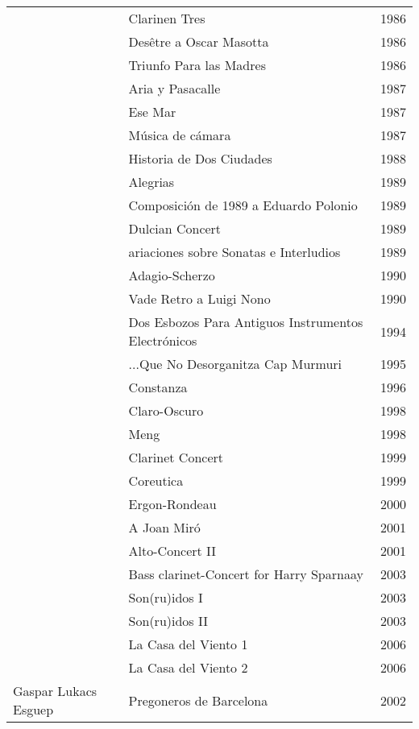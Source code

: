 \begin{center}
\begin{longtable}{ p{}  p{}  p{} }
& Clarinen Tres & 1986 \\ \cmidrule (r){2-3} 
& Desêtre a Oscar Masotta & 1986 \\ \cmidrule (r){2-3} 
& Triunfo Para las Madres & 1986 \\ \cmidrule (r){2-3} 
& Aria y Pasacalle & 1987 \\ \cmidrule (r){2-3} 
& Ese Mar & 1987 \\ \cmidrule (r){2-3} 
& Música de cámara & 1987 \\ \cmidrule (r){2-3} 
& Historia de Dos Ciudades & 1988 \\ \cmidrule (r){2-3} 
& Alegrias & 1989 \\ \cmidrule (r){2-3} 
& Composición de 1989 a Eduardo Polonio & 1989 \\ \cmidrule (r){2-3} 
& Dulcian Concert & 1989 \\ \cmidrule (r){2-3} 
& ariaciones sobre Sonatas e Interludios & 1989 \\ \cmidrule (r){2-3} 
& Adagio-Scherzo & 1990 \\ \cmidrule (r){2-3} 
& Vade Retro a Luigi Nono & 1990 \\ \cmidrule (r){2-3} 
& Dos Esbozos Para Antiguos Instrumentos Electrónicos & 1994 \\ \cmidrule (r){2-3} 
& ...Que No Desorganitza Cap Murmuri & 1995 \\ \cmidrule (r){2-3} 
& Constanza & 1996 \\ \cmidrule (r){2-3} 
& Claro-Oscuro & 1998 \\ \cmidrule (r){2-3} 
& Meng & 1998 \\ \cmidrule (r){2-3} 
& Clarinet Concert & 1999 \\ \cmidrule (r){2-3} 
& Coreutica & 1999 \\ \cmidrule (r){2-3} 
& Ergon-Rondeau & 2000 \\ \cmidrule (r){2-3} 
& A Joan Miró & 2001 \\ \cmidrule (r){2-3} 
& Alto-Concert II & 2001 \\ \cmidrule (r){2-3} 
& Bass clarinet-Concert for Harry Sparnaay & 2003 \\ \cmidrule (r){2-3} 
& Son(ru)idos I & 2003 \\ \cmidrule (r){2-3} 
& Son(ru)idos II & 2003 \\ \cmidrule (r){2-3} 
& La Casa del Viento 1 & 2006 \\ \cmidrule (r){2-3} 
& La Casa del Viento 2 & 2006 \\ \midrule 
Gaspar Lukacs Esguep & Pregoneros de Barcelona & 2002 \\ \midrule 

\end{longtable}
\end{center}
